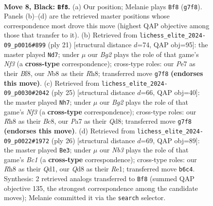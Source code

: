\documentclass[11pt]{article}
\begin{document}
\begin{figure}[p]\centering
\begin{subfigure}{0.46\textwidth}\centering
\resizebox{\linewidth}{!}{%
\newchessgame
\chessboard[
  setfen={rnbqk2r/ppp1ppbp/1n4p1/3pP1N1/3P4/1B6/PPP2PPP/RNBQ1RK1 b kq - 1 8},
  showmover=false,
  pgfstyle=straightmove, color=movearrow, markmove={g7-f8}
]}
\caption{}
\end{subfigure}\hfill
\begin{subfigure}{0.46\textwidth}\centering
\resizebox{\linewidth}{!}{%
\newchessgame
\chessboard[
  setfen={r2qkb1r/pp3ppp/4bn2/1Np1p3/P2pP3/6Q1/1P1P1PPP/R1B1KB1R b KQkq - 2 11},
  showmover=false,
  pgfstyle=straightmove, color=movearrow, markmove={f6-d7}
]}
\caption{}
\end{subfigure}
\\[4pt]
\begin{subfigure}{0.46\textwidth}\centering
\resizebox{\linewidth}{!}{%
\newchessgame
\chessboard[
  setfen={2bqr1k1/1pppbpp1/r4n1p/p3p3/N1P1P3/1Q1P2PP/PP3PB1/R1B2RK1 b - - 0 13},
  showmover=false,
  pgfstyle=straightmove, color=movearrow, markmove={f6-h7}
]}
\caption{}
\end{subfigure}\hfill
\begin{subfigure}{0.46\textwidth}\centering
\resizebox{\linewidth}{!}{%
\newchessgame
\chessboard[
  setfen={r2q1rk1/pb2ppbp/1p1n2p1/2pPp3/2P1P3/3B1N1P/PP3PP1/R1BQR1K1 w - - 1 14},
  showmover=false,
  pgfstyle=straightmove, color=movearrow, markmove={c1-e3}
]}
\caption{}
\end{subfigure}
\caption{\textbf{Move 8, Black: \texttt{Bf8}.} (a) Our position; Melanie plays \texttt{Bf8} (\texttt{g7f8}). Panels (b)--(d) are the retrieved master positions whose correspondence most drove this move (highest QAP objective among those that transfer to it). (b) Retrieved from \texttt{lichess\_elite\_2024-09\_p0016\#899} (ply 21) [structural distance $d$=74, QAP obj=95]: the master played \texttt{Nd7}; under $\mu$ our \emph{Bg2} plays the role of that game's \emph{Nf3} (a \textbf{cross-type} correspondence); cross-type roles: our \emph{P}e7 as their \emph{B}f8, our \emph{N}b8 as their \emph{R}h8; transferred move \texttt{g7f8} \textbf{(endorses this move)}. (c) Retrieved from \texttt{lichess\_elite\_2024-09\_p0030\#2042} (ply 25) [structural distance $d$=66, QAP obj=40]: the master played \texttt{Nh7}; under $\mu$ our \emph{Bg2} plays the role of that game's \emph{Nf3} (a \textbf{cross-type} correspondence); cross-type roles: our \emph{R}h8 as their \emph{B}c8, our \emph{P}a7 as their \emph{Q}d8; transferred move \texttt{g7f8} \textbf{(endorses this move)}. (d) Retrieved from \texttt{lichess\_elite\_2024-09\_p0022\#1972} (ply 26) [structural distance $d$=69, QAP obj=89]: the master played \texttt{Be3}; under $\mu$ our \emph{Nb3} plays the role of that game's \emph{Bc1} (a \textbf{cross-type} correspondence); cross-type roles: our \emph{R}h8 as their \emph{Q}d1, our \emph{Q}d8 as their \emph{R}e1; transferred move \texttt{b6c4}. Synthesis: 2 retrieved analogs transferred to \texttt{Bf8} (summed QAP objective 135, the strongest correspondence among the candidate moves); Melanie committed it via the \texttt{search} selector.}
\label{fig:thought-m15}
\end{figure}
\end{document}
